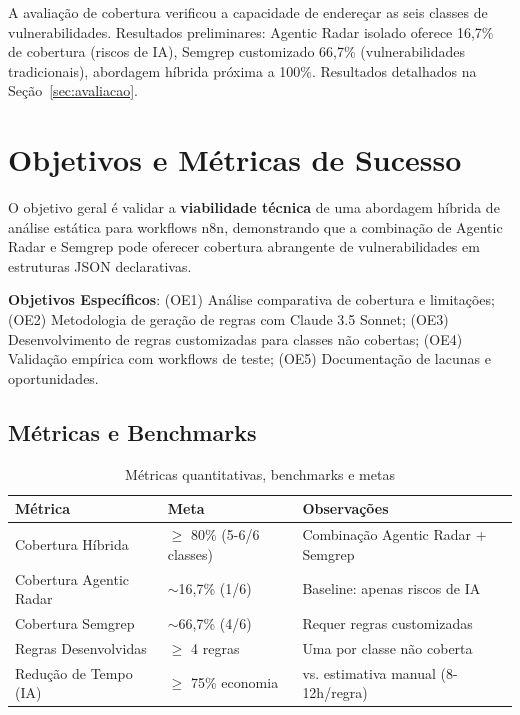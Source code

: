 \documentclass[12pt,a4paper]{article}
\begin{document}
A avaliação de cobertura verificou a capacidade de endereçar as seis classes de vulnerabilidades. Resultados preliminares: Agentic Radar isolado oferece 16,7\% de cobertura (riscos de IA), Semgrep customizado 66,7\% (vulnerabilidades tradicionais), abordagem híbrida próxima a 100\%. Resultados detalhados na Seção~\ref{sec:avaliacao}.

\section{Objetivos e Métricas de Sucesso}
\label{sec:objetivos}

O objetivo geral é validar a \textbf{viabilidade técnica} de uma abordagem híbrida de análise estática para workflows n8n, demonstrando que a combinação de Agentic Radar e Semgrep pode oferecer cobertura abrangente de vulnerabilidades em estruturas JSON declarativas.

\textbf{Objetivos Específicos}: (OE1) Análise comparativa de cobertura e limitações; (OE2) Metodologia de geração de regras com Claude 3.5 Sonnet; (OE3) Desenvolvimento de regras customizadas para classes não cobertas; (OE4) Validação empírica com workflows de teste; (OE5) Documentação de lacunas e oportunidades.

\subsection{Métricas e Benchmarks}

\begin{table}[H]
\centering \small
\caption{Métricas quantitativas, benchmarks e metas}
\label{tab:metricas-benchmarks}
\begin{tabular}{@{}p{4cm}p{3.5cm}p{5.5cm}@{}}
\toprule
\textbf{Métrica} & \textbf{Meta} & \textbf{Observações} \\ \midrule
Cobertura Híbrida & $\geq$ 80\% (5-6/6 classes) & Combinação Agentic Radar + Semgrep \\
Cobertura Agentic Radar & $\sim$16,7\% (1/6) & Baseline: apenas riscos de IA \\
Cobertura Semgrep & $\sim$66,7\% (4/6) & Requer regras customizadas \\
Regras Desenvolvidas & $\geq$ 4 regras & Uma por classe não coberta \\
Redução de Tempo (IA) & $\geq$ 75\% economia & vs. estimativa manual (8-12h/regra) \\
\bottomrule
\end{tabular}
\end{table}
\end{document}
